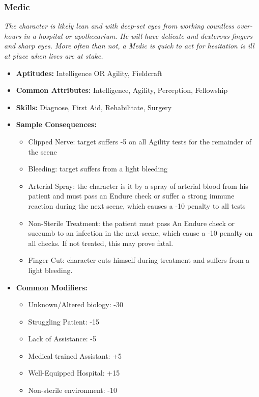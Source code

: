 \subsubsection{Medic}\label{Medic}
\textit{The character is likely lean and with deep-set eyes from working countless over-hours in a hospital or apothecarium.
He will have delicate and dexterous fingers and sharp eyes.
More often than not, a Medic is quick to act for hesitation is ill at place when lives are at stake.}
\begin{itemize}
	\item \textbf{Aptitudes:} Intelligence OR Agility, Fieldcraft
	\item \textbf{Common Attributes:} Intelligence, Agility, Perception, Fellowship
	\item \textbf{Skills:} Diagnose, First Aid, Rehabilitate, Surgery
	\item \textbf{Sample Consequences:} 
	\begin{itemize}
		\item Clipped Nerve: target suffers -5 on all Agility tests for the remainder of the scene
		\item Bleeding: target suffers from a light bleeding
		\item Arterial Spray: the character is it by a spray of arterial blood from his patient and must pass an Endure check or suffer a strong immune reaction during the next scene, which causes a -10 penalty to all tests
		\item Non-Sterile Treatment: the patient must pass An Endure check or succumb to an infection in the next scene, which cause a -10 penalty on all checks. If not treated, this may prove fatal.
		\item Finger Cut: character cuts himself during treatment and suffers from a light bleeding.
	\end{itemize}
	\item \textbf{Common Modifiers:}
	\begin{itemize}
		\item Unknown/Altered biology: -30
		\item Struggling Patient: -15
		\item Lack of Assistance: -5
		\item Medical trained Assistant: +5
		\item Well-Equipped Hospital: +15
		\item Non-sterile environment: -10
	\end{itemize}
\end{itemize}




